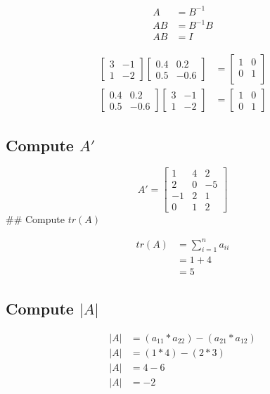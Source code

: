 \documentclass[
  letterpaper,
  DIV=11,
  numbers=noendperiod]{scrartcl}
\begin{document}
\[
\begin{aligned}
A &= B^{-1} \\
AB &= B^{-1}B \\
AB &= I
\end{aligned}
\]

\[
\begin{aligned}
\begin{bmatrix}
3 & -1 \\
1 & -2 \end{bmatrix}
\begin{bmatrix}
0.4 & 0.2 \\
0.5 & -0.6 \end{bmatrix} &= 
\begin{bmatrix}
1 & 0\\
0 & 1 \\ \end{bmatrix} \\
\begin{bmatrix}
0.4 & 0.2\\
0.5 & -0.6 \end{bmatrix} 
\begin{bmatrix}
3 & -1\\
1 & -2 \end{bmatrix} &= 
\begin{bmatrix}
1 & 0\\
0 & 1 \end{bmatrix}
\end{aligned}
\]

\hypertarget{compute-a}{%
\subsection{\texorpdfstring{Compute
\(A'\)}{Compute A\textquotesingle{}}}\label{compute-a}}

\[
A' =
\begin{bmatrix}
1&4&2\\
2&0&-5\\
-1&2&1\\
0&1&2 \end{bmatrix}
\] \#\# Compute \(tr(A)\)

\[
\begin{aligned}
tr(A)&=\sum_{i=1}^n a_{ii}\\
&=1+4\\
&=5
\end{aligned}
\]

\hypertarget{compute-a-1}{%
\subsection{\texorpdfstring{Compute
\(|A|\)}{Compute \textbar A\textbar{}}}\label{compute-a-1}}

\[
\begin{aligned}
|A| &= (a_{11} * a_{22}) - (a_{21} * a_{12})\\
|A| &= (1*4) - (2 * 3)\\
|A| &= 4-6\\
|A| &=-2
\end{aligned}
\]
\end{document}
